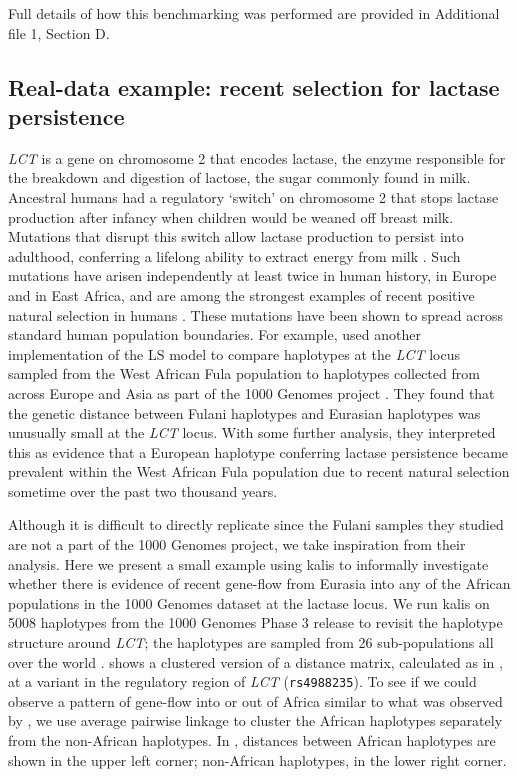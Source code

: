 \documentclass[pdflatex,referee,lineno,sn-nature]{sn-jnl}%
\newcommand{\pkg}[1]{{\fontseries{m}\fontseries{b}\selectfont #1}}
\begin{document}
Full details of how this benchmarking was performed are provided in Additional file 1, Section D.


\subsection*{Real-data example: recent selection for lactase persistence}
\label{sec:realdata}

\emph{LCT} is a gene on chromosome 2 that encodes lactase, the enzyme responsible for the breakdown and digestion of lactose, the sugar commonly found in milk.
Ancestral humans had a regulatory `switch' on chromosome 2 that stops lactase production after infancy when children would be weaned off breast milk.
Mutations that disrupt this switch allow lactase production to persist into adulthood, conferring a lifelong ability to extract energy from milk \cite{ingram2009lactose}.
Such mutations have arisen independently at least twice in human history, in Europe and in East Africa, and are among the strongest examples of recent positive natural selection in humans \cite{ranciaro2014genetic, bersaglieri2004genetic}.
These mutations have been shown to spread across standard human population boundaries.
For example, \cite{busby2017inferring} used another implementation of the LS model to compare haplotypes at the \emph{LCT} locus sampled from the West African Fula population to haplotypes collected from across Europe and Asia as part of the 1000 Genomes project \cite{10002015global}.
They found that the genetic distance between Fulani haplotypes and Eurasian haplotypes was unusually small at the \emph{LCT} locus.
With some further analysis, they interpreted this as evidence that a European haplotype conferring lactase persistence became prevalent within the West African Fula population due to recent natural selection sometime over the past two thousand years.

Although it is difficult to directly replicate \cite{busby2017inferring} since the Fulani samples they studied are not a part of the 1000 Genomes project, we take inspiration from their analysis.
Here we present a small example using kalis to informally investigate whether there is evidence of recent gene-flow from Eurasia into any of the African populations in the 1000 Genomes dataset at the lactase locus.
We run \pkg{kalis} on 5008 haplotypes from the 1000 Genomes Phase 3 release to revisit the haplotype structure around \emph{LCT}; the haplotypes are sampled from 26 sub-populations all over the world \cite{10002015global}.
 shows a clustered version of a distance matrix, calculated as in , at a variant in the regulatory region of \emph{LCT} (\texttt{rs4988235}).
To see if we could observe a pattern of gene-flow into or out of Africa similar to what was observed by \cite{busby2017inferring}, we use average pairwise linkage \cite{sokal1958statistical} to cluster the African haplotypes separately from the non-African haplotypes. In , distances between African haplotypes are shown in the upper left corner; non-African haplotypes, in the lower right corner.
\end{document}
